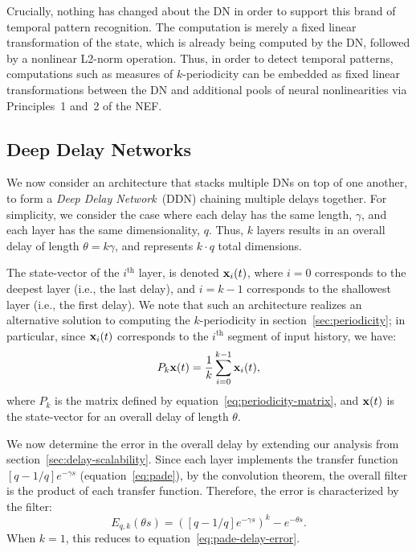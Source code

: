 Crucially, nothing has changed about the DN in order to support this brand of temporal pattern recognition.
The computation is merely a fixed linear transformation of the state, which is already being computed by the DN, followed by a nonlinear L2-norm operation.
Thus, in order to detect temporal patterns, computations such as measures of $k$-periodicity can be embedded as fixed linear transformations between the DN and additional pools of neural nonlinearities via Principles~1 and~2 of the NEF.

\subsection{Deep Delay Networks}
\label{sec:deep-delay-networks}

We now consider an architecture that stacks multiple DNs on top of one another, to form a \emph{Deep Delay Network}~(DDN) chaining multiple delays together.
For simplicity, we consider the case where each delay has the same length, $\gamma$, and each layer has the same dimensionality, $q$.
Thus, $k$ layers results in an overall delay of length $\theta = k \gamma$, and represents $k \cdot q$ total dimensions.

The state-vector of the $i^\text{th}$ layer, is denoted $\mathbf{x}_i(t)$, where $i=0$ corresponds to the deepest layer (i.e., the last delay), and $i=k-1$ corresponds to the shallowest layer (i.e., the first delay).
We note that such an architecture realizes an alternative solution to computing the $k$-periodicity in section~\ref{sec:periodicity}; in particular, since $\mathbf{x}_i(t)$ corresponds to the $i^\text{th}$ segment of input history, we have:
\begin{equation*}
P_k \mathbf{x}(t) = \frac{1}{k} \sum_{i=0}^{k-1} \mathbf{x}_i(t) \text{,}
\end{equation*}
where $P_k$ is the matrix defined by equation~\ref{eq:periodicity-matrix}, and $\mathbf{x}(t)$ is the state-vector for an overall delay of length $\theta$.

We now determine the error in the overall delay by extending our analysis from section~\ref{sec:delay-scalability}.
Since each layer implements the transfer function $[q-1/q]e^{-\gamma s}$ (equation~\ref{eq:pade}), by the convolution theorem, the overall filter is the product of each transfer function.
Therefore, the error is characterized by the filter:
\begin{equation} \label{eq:deep-delay-network-error}
E_{q,k}(\theta s) = \left( [q-1/q]e^{-\gamma s} \right)^k - e^{-\theta s} \text{.}
\end{equation}
When $k = 1$, this reduces to equation~\ref{eq:pade-delay-error}.

